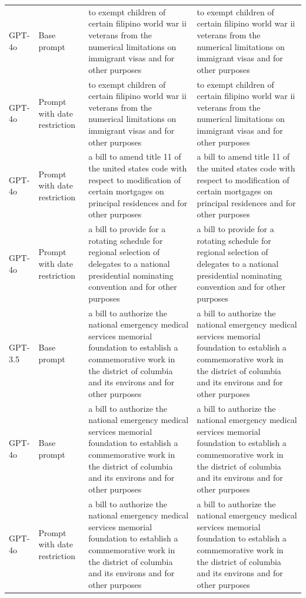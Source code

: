 \begin{longtable}{>{\raggedright\arraybackslash}p{1.4cm}>{\raggedright\arraybackslash}p{1.4cm}>{\raggedright\arraybackslash}p{5.5cm}>{\raggedright\arraybackslash}p{5.5cm}}
GPT-4o & Base prompt & to exempt children of certain filipino world war ii veterans from the numerical limitations on immigrant visas and for other purposes & to exempt children of certain filipino world war ii veterans from the numerical limitations on immigrant visas and for other purposes\\
GPT-4o & Prompt with date restriction & to exempt children of certain filipino world war ii veterans from the numerical limitations on immigrant visas and for other purposes & to exempt children of certain filipino world war ii veterans from the numerical limitations on immigrant visas and for other purposes\\
GPT-4o & Prompt with date restriction & a bill to amend title 11 of the united states code with respect to modification of certain mortgages on principal residences and for other purposes & a bill to amend title 11 of the united states code with respect to modification of certain mortgages on principal residences and for other purposes\\
GPT-4o & Prompt with date restriction & a bill to provide for a rotating schedule for regional selection of delegates to a national presidential nominating convention and for other purposes & a bill to provide for a rotating schedule for regional selection of delegates to a national presidential nominating convention and for other purposes\\
GPT-3.5 & Base prompt & a bill to authorize the national emergency medical services memorial foundation to establish a commemorative work in the district of columbia and its environs and for other purposes & a bill to authorize the national emergency medical services memorial foundation to establish a commemorative work in the district of columbia and its environs and for other purposes\\
GPT-4o & Base prompt & a bill to authorize the national emergency medical services memorial foundation to establish a commemorative work in the district of columbia and its environs and for other purposes & a bill to authorize the national emergency medical services memorial foundation to establish a commemorative work in the district of columbia and its environs and for other purposes\\
GPT-4o & Prompt with date restriction & a bill to authorize the national emergency medical services memorial foundation to establish a commemorative work in the district of columbia and its environs and for other purposes & a bill to authorize the national emergency medical services memorial foundation to establish a commemorative work in the district of columbia and its environs and for other purposes\\

\end{longtable}
